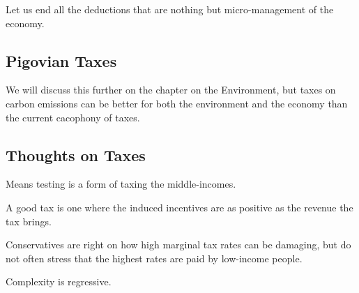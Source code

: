 Let us end all the deductions that are nothing but micro-management of the
economy.

\subsection{Pigovian Taxes}

We will discuss this further on the chapter on the Environment, but taxes on
carbon emissions can be better for both the environment and the economy than
the current cacophony of taxes.

\subsection{Thoughts on Taxes}

\thought Means testing is a form of taxing the middle-incomes.

\thought A good tax is one where the induced incentives are as positive as the
revenue the tax brings.

\thought Conservatives are right on how high marginal tax rates can be
damaging, but do not often stress that the highest rates are paid by low-income
people.

\thought Complexity is regressive.


